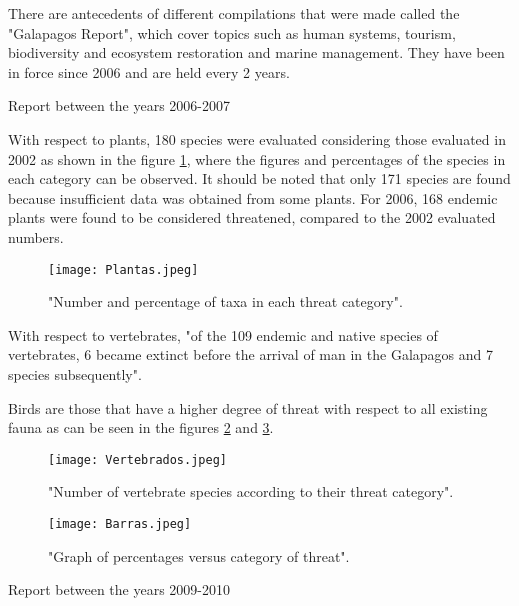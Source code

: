 \documentclass[10pt,english, openany]{book}
\begin{document}


There are antecedents of different compilations that were made called the "Galapagos Report", which cover topics such as human systems, tourism, biodiversity and ecosystem restoration and marine management. They have been in force since 2006 and are held every 2 years.

Report between the years 2006-2007

With respect to plants, 180 species were evaluated considering those evaluated in 2002 as shown in the figure \ref{fig12:spect}, where the figures and percentages of the species in each category can be observed. It should be noted that only 171 species are found because insufficient data was obtained from some plants. For 2006, 168 endemic plants were found to be considered threatened, compared to the 2002 evaluated numbers.\cite{FCD2007}

\pagebreak

\begin{figure}[h!]
    \centering
    \texttt{[image: Plantas.jpeg]}
    \caption{"Number and percentage of taxa in each threat category".\cite{FCD2007}}
    \label{fig12:spect}
\end{figure}

With respect to vertebrates, "of the 109 endemic and native species of vertebrates, 6 became extinct before the arrival of man in the Galapagos and 7 species subsequently".\cite{FCD2007}

Birds are those that have a higher degree of threat with respect to all existing fauna as can be seen in the figures \ref{fig13:spect} and \ref{fig14:spect}.

\begin{figure}[h!]
    \centering
    \texttt{[image: Vertebrados.jpeg]}
    \caption{"Number of vertebrate species according to their threat category".\cite{FCD2007}}
    \label{fig13:spect}
\end{figure}

\vspace{1cm}

\begin{figure}[h!]
    \centering
    \texttt{[image: Barras.jpeg]}
    \caption{"Graph of percentages versus category of threat".\cite{FCD2007}}
    \label{fig14:spect}
\end{figure}

\pagebreak

Report between the years 2009-2010
\end{document}
